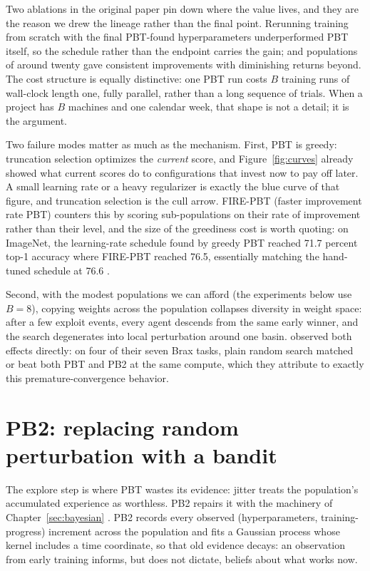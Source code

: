 Two ablations in the original paper pin down where the value lives, and
they are the reason we drew the lineage rather than the final point.
Rerunning training from scratch with the final PBT-found hyperparameters
underperformed PBT itself, so the schedule rather than the endpoint
carries the gain; and populations of around twenty gave consistent
improvements with diminishing returns beyond. The cost structure is
equally distinctive: one PBT run costs $B$ training runs of wall-clock
length one, fully parallel, rather than a long sequence of trials. When a
project has $B$ machines and one calendar week, that shape is not a detail;
it is the argument.

Two failure modes matter as much as the mechanism. First, PBT is greedy:
truncation selection optimizes the \emph{current} score, and
Figure~\ref{fig:curves} already showed what current scores do to
configurations that invest now to pay off later. A small learning rate or
a heavy regularizer is exactly the blue curve of that figure, and
truncation selection is the cull arrow. FIRE-PBT (faster improvement
rate PBT) counters this by scoring
sub-populations on their rate of improvement rather than their level, and
the size of the greediness cost is worth quoting: on ImageNet, the
learning-rate schedule found by greedy PBT reached 71.7 percent top-1
accuracy where FIRE-PBT reached 76.5, essentially matching the hand-tuned
schedule at 76.6 \citep{dalibard2021firepbt}.

Second, with the modest
populations we can afford (the experiments below use $B = 8$), copying
weights across the population collapses diversity in weight space: after
a few exploit events, every agent descends from the same early winner,
and the search degenerates into local perturbation around one basin.
\citet{wan2022bgpbt} observed both effects directly: on four of their
seven Brax tasks, plain random search matched or beat both PBT and PB2 at
the same compute, which they attribute to exactly this
premature-convergence behavior.

\section{PB2: replacing random perturbation with a bandit}

The explore step is where PBT wastes its evidence: jitter treats the
population's accumulated experience as worthless. PB2 repairs it with the
machinery of Chapter~\ref{sec:bayesian} \citep{parkerholder2020pb2}. PB2
records every observed (hyperparameters, training-progress) increment
across the population and fits a Gaussian process whose kernel includes a
time coordinate, so that old evidence decays: an observation from early
training informs, but does not dictate, beliefs about what works now.

